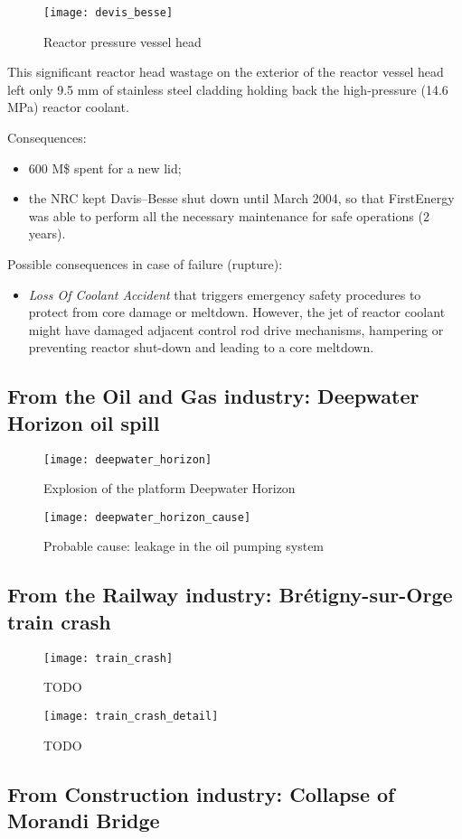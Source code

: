 \begin{figure}[!htp]
    \centering
    \texttt{[image: devis\_besse]}
    \caption{Reactor pressure vessel head}
    \label{fig:devis_besse}
\end{figure}

This significant reactor head wastage on the exterior of the reactor vessel head
left only 9.5 mm of stainless steel cladding holding back the high-pressure
(14.6 MPa) reactor coolant.

Consequences:
\begin{itemize}
    \item 600 M\$ spent for a new lid;
    \item the NRC kept Davis–Besse shut down until March 2004, so that
    FirstEnergy was able to perform all the necessary maintenance for safe
    operations (2 years).
\end{itemize}

Possible consequences in case of failure (rupture):
\begin{itemize}
    \item \emph{Loss Of Coolant Accident} that triggers emergency safety procedures to protect from core damage or meltdown. However, the jet of reactor coolant might have damaged adjacent control rod drive mechanisms, hampering or preventing reactor shut-down and leading to a core meltdown.
\end{itemize}

\subsection{From the Oil and Gas industry: Deepwater Horizon oil spill}
\begin{figure}[!htp]
    \centering
    \texttt{[image: deepwater\_horizon]}
    \caption{Explosion of the platform Deepwater Horizon}
\end{figure}

\begin{figure}[!htp]
    \centering
    \texttt{[image: deepwater\_horizon\_cause]}
    \caption{Probable cause: leakage in the oil pumping system}
\end{figure}

\subsection{From the Railway industry: Brétigny-sur-Orge train crash}
\begin{figure}[!htp]
    \centering
    \texttt{[image: train\_crash]}
    \caption{TODO}
\end{figure}

\begin{figure}[!htp]
    \centering
    \texttt{[image: train\_crash\_detail]}
    \caption{TODO}
\end{figure}

\subsection{From Construction industry: Collapse of Morandi Bridge}